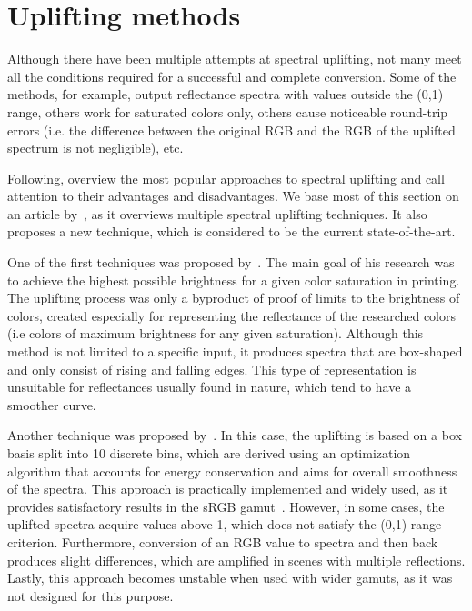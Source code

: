 \section{Uplifting methods} \label{sec:upliftingMethods}

Although there have been multiple attempts at spectral uplifting, not many meet all the conditions required for a successful and complete conversion. Some of the methods, for example, output reflectance spectra with values outside the (0,1) range, others work for saturated colors only, others cause noticeable round-trip errors (i.e. the difference between the original RGB and the RGB of the uplifted spectrum is not negligible), etc.

Following, overview the most popular approaches to spectral uplifting and call attention to their advantages and disadvantages. We base most of this section on an article by~\citet{upsamplingTechniques}, as it overviews multiple spectral uplifting techniques. It also proposes a new technique, which is considered to be the current state-of-the-art.

One of the first techniques was proposed by~\citet{upsamplingMacAdam}. The main goal of his research was to achieve the highest possible brightness for a given color saturation in printing. The uplifting process was only a byproduct of proof of limits to the brightness of colors, created especially for representing the reflectance of the researched colors (i.e colors of maximum brightness for any given saturation). Although this method is not limited to a specific input, it produces spectra that are box-shaped and only consist of rising and falling edges. This type of representation is unsuitable for reflectances usually found in nature, which tend to have a smoother curve.

Another technique was proposed by~\citet{upsamplingSmits}. In this case, the uplifting is based on a box basis split into 10 discrete bins, which are derived using an optimization algorithm that accounts for energy conservation and aims for overall smoothness of the spectra. This approach is practically implemented and widely used, as it provides satisfactory results in the sRGB gamut~\cite{upsamplingJakobHanika}. However, in some cases, the uplifted spectra acquire values above 1, which does not satisfy the (0,1) range criterion. Furthermore, conversion of an RGB value to spectra and then back produces slight differences, which are amplified in scenes with multiple reflections. Lastly, this approach becomes unstable when used with wider gamuts, as it was not designed for this purpose.

